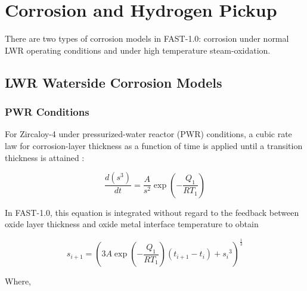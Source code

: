 \section{Corrosion and Hydrogen Pickup}\label{section:corrosion-and-hydrogen-pickup}

There are two types of corrosion models in FAST-1.0: corrosion under normal LWR operating conditions
and under high temperature steam-oxidation.

\subsection{LWR Waterside Corrosion Models}\label{section:lwr-waterside-corrosion-models}

\subsubsection{PWR Conditions}\label{section:pwr-conditions}

For Zircaloy-4 under pressurized-water reactor (PWR) conditions, a cubic rate law for
corrosion-layer thickness as a function of time is applied until a transition thickness is attained
\cite{ref:Garzarolli1982}:

\begin{equation}
    \label{eq:cubic_rate_law_function_of_time}
    \frac{d\left( s^{3} \right)}{dt} = \frac{A}{s^{2}}\exp\left( - \frac{Q_{1}}{RT_{1}} \right)
\end{equation}

In FAST-1.0, this equation is integrated without regard to the feedback between oxide layer
thickness and oxide metal interface temperature to obtain

\begin{equation}
    \label{eq:cubic_rate_law_integrated}
    s_{i + 1} = \left( 3A\exp\left( - \frac{Q_{1}}{RT_{1}} \right)\left( t_{i + 1} - t_{i} \right) + {s_{i}}^{3} \right)^{\frac{1}{3}}
\end{equation}

Where,

